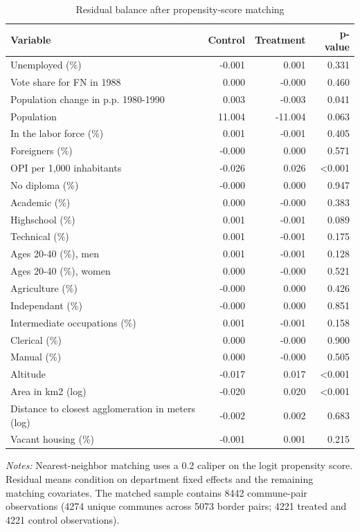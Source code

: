\begin{table}[!htbp]
\centering
\scriptsize
\caption{Residual balance after propensity-score matching}
\label{tab:ttest-border-matching}
\begin{tabular}{lrrr}
\hline
Variable & Control & Treatment & p-value \\
\hline
Unemployed (\%) & -0.001 & 0.001 & 0.331 \\
Vote share for FN in 1988 & 0.000 & -0.000 & 0.460 \\
Population change in p.p. 1980-1990 & 0.003 & -0.003 & 0.041 \\
Population & 11.004 & -11.004 & 0.063 \\
In the labor force (\%) & 0.001 & -0.001 & 0.405 \\
Foreigners (\%) & -0.000 & 0.000 & 0.571 \\
OPI per 1,000 inhabitants & -0.026 & 0.026 & <0.001 \\
No diploma (\%) & -0.000 & 0.000 & 0.947 \\
Academic (\%) & 0.000 & -0.000 & 0.383 \\
Highschool (\%) & 0.001 & -0.001 & 0.089 \\
Technical (\%) & 0.001 & -0.001 & 0.175 \\
Ages 20-40 (\%), men & 0.001 & -0.001 & 0.128 \\
Ages 20-40 (\%), women & 0.000 & -0.000 & 0.521 \\
Agriculture (\%) & -0.000 & 0.000 & 0.426 \\
Independant (\%) & -0.000 & 0.000 & 0.851 \\
Intermediate occupations (\%) & 0.001 & -0.001 & 0.158 \\
Clerical (\%) & 0.000 & -0.000 & 0.900 \\
Manual (\%) & 0.000 & -0.000 & 0.505 \\
Altitude & -0.017 & 0.017 & <0.001 \\
Area in km2 (log) & -0.020 & 0.020 & <0.001 \\
Distance to closest agglomeration in meters (log) & -0.002 & 0.002 & 0.683 \\
Vacant housing (\%) & -0.001 & 0.001 & 0.215 \\
\hline
\end{tabular}
\parbox{\textwidth}{\footnotesize \textit{Notes:} Nearest-neighbor matching uses a 0.2 caliper on the logit propensity score. Residual means condition on department fixed effects and the remaining matching covariates. The matched sample contains 8442 commune-pair observations (4274 unique communes across 5073 border pairs; 4221 treated and 4221 control observations).}
\end{table}
